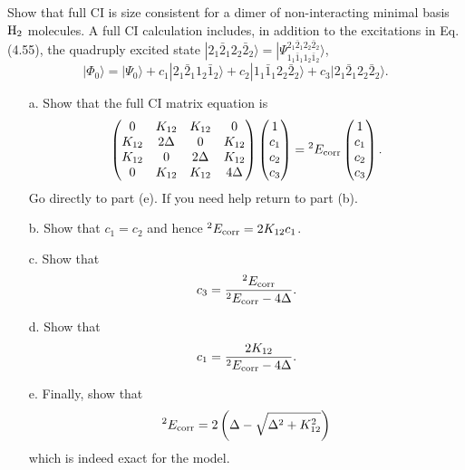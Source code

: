 \documentclass[a4paper]{book}
\newcounter{exercise}[chapter]
\newcommand{\corr}{{\rm corr}}
\begin{document}
	\begin{exercise}
	Show that full CI is size consistent for a dimer of non-interacting minimal basis $\ce{H_2}$ molecules. A full CI calculation includes, in addition to the excitations in Eq.(4.55), the quadruply excited state $| 2_1 \bar{2}_1 2_2 \bar{2}_2 \rangle = | \Psi^{2_1 \bar{2}_1 2_2 \bar{2}_2}_{1_1 \bar{1}_1 1_2 \bar{1}_2} \rangle$,
	\[
		| \Phi_0 \rangle = | \Psi_0 \rangle + c_1 | 2_1 \bar{2}_1 1_2 \bar{1}_2 \rangle + c_2 | 1_1 \bar{1}_1 2_2 \bar{2}_2 \rangle + c_3 | 2_1 \bar{2}_1 2_2 \bar{2}_2 \rangle.
	\]
	\begin{enumerate}
	
	\item[a.] Show that the full CI matrix equation is
	\[
		\begin{pmatrix}
			0 & K_{12} & K_{12} & 0 \\
			K_{12} & 2\Delta & 0 & K_{12} \\
			K_{12} & 0 & 2\Delta & K_{12} \\
			0 & K_{12} & K_{12} & 4\Delta
		\end{pmatrix} \begin{pmatrix}
			1 \\ c_1 \\ c_2 \\c_3
		\end{pmatrix} = {}^{2} E_{\rm corr} \begin{pmatrix}
			1 \\ c_1 \\ c_2 \\ c_3
		\end{pmatrix}.
	\]	
	Go directly to part (e). If you need help return to part (b).
	
	\item[b.] Show that $c_1 = c_2$ and hence ${}^{2} E_{\rm corr} = 2 K_{12} c_1$.
	
	\item[c.] Show that
	\[
		c_3 = \frac{ {}^{2} E_\corr }{ {}^{2} E_\corr - 4\Delta}.
	\]
	
	\item[d.] Show that
	\[
		c_1 = \frac{ 2 K_{12} }{ {}^{2} E_\corr - 4\Delta }.
	\]
	
	\item[e.] Finally, show that
	\[
		{}^{2} E_\corr = 2\left( \Delta - \sqrt{ \Delta^2 + K^2_{12} } \right)
	\]
	which is indeed exact for the model.
	\end{enumerate}
	

\end{exercise}
\end{document}
